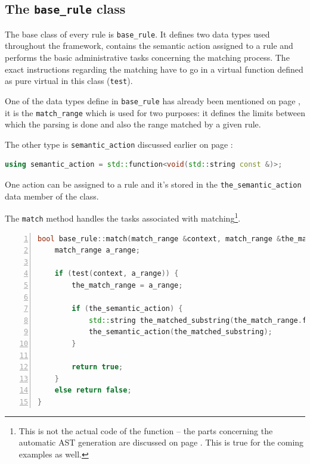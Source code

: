 \documentclass[12pt]{article}
\newcommand{\usubsec}[2]{\subsection*{#1}\label{subsec:#2}\addcontentsline{toc}{subsection}{#1}}
\begin{document}
\usubsec{The \texttt{base\_rule} class}{baserule}
The base class of every rule is \texttt{base\_rule}. It defines two data types used throughout the framework,
contains the semantic action assigned to a rule and performs the basic administrative tasks concerning the
matching process. The exact instructions regarding the matching have to go in a virtual function defined as
pure virtual in this class (\texttt{test}).

One of the data types define in \texttt{base\_rule} has already been mentioned on page
\pageref{lst:matchrange}, it is the \texttt{match\_range} which is used for two purposes: it defines the
limits between which the parsing is done and also the range matched by a given rule.

The other type is \texttt{semantic\_action} discussed earlier on page \pageref{subsec:actions}:

\begin{center}
	\begin{minipage}[h]{0.8\textwidth}
		\begin{lstlisting}[language=C++, breaklines=true]
using semantic_action = std::function<void(std::string const &)>;
		\end{lstlisting}
	\end{minipage}
\end{center}

One action can be assigned to a rule and it's stored in the \texttt{the\_semantic\_action} data member of the
class.

The \texttt{match} method handles the tasks associated with matching\footnote{This is not the actual code of
the function -- the parts concerning the automatic AST generation are discussed on page \pageref{subsec:ast}.
This is true for the coming examples as well.}.

\begin{center}
	\begin{minipage}[h]{0.8\textwidth}
		\begin{lstlisting}[language=C++, breaklines=true, numbers=left]
bool base_rule::match(match_range &context, match_range &the_match_range) {
	match_range a_range;

	if (test(context, a_range)) {
		the_match_range = a_range;

		if (the_semantic_action) {
			std::string the_matched_substring(the_match_range.first, the_match_range.second);
			the_semantic_action(the_matched_substring);
		}

		return true;
	}
	else return false;
}
		\end{lstlisting}
	\end{minipage}
\end{center}
\end{document}
